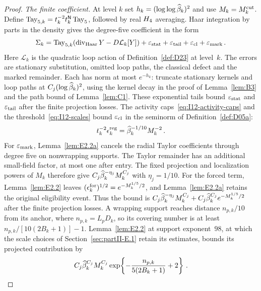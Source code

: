 \begin{proof}
\emph{The finite coefficient.} At level $k$ set $h_k=(\log\log\widehat{\beta}_k)^2$ and use $M_k=M^{\mathrm{cut}}_k$. Define $\operatorname{Tay}_{5,k}=t_k^{-2}t_k^{\mathsf{N}}\operatorname{Tay}_5$, followed by real $H_4$ averaging. Haar integration by parts in the density gives the degree-five coefficient in the form
\begin{equation}\label{eq:I-five-pieces}
\Sigma_k=\operatorname{Tay}_{5,k}(\operatorname{div}_{\rm Haar}Y-D\mathcal L_k[Y])
+\varepsilon_{\rm stat}+\varepsilon_{\rm tail}+\varepsilon_{\rm cl}+\varepsilon_{\rm mark}\,.
\end{equation}
Here $\mathcal L_k$ is the quadratic loop action of Definition~\ref{def:D23} at level~$k$. The errors are stationary substitution, omitted loop paths, the classical defect and the marked remainder. Each has norm at most $e^{-h_k}$: truncate stationary kernels and loop paths at $C_j(\log\widehat{\beta}_k)^2$, using the kernel decay in the proof of Lemma~\ref{lem:B3} and the path bound of Lemma~\ref{lem:C1}. These exponential tails bound $\varepsilon_{\rm stat}$ and $\varepsilon_{\rm tail}$ after the finite projection losses. The activity caps~\eqref{eq:I12-activity-caps} and the threshold~\eqref{eq:I12-scales} bound $\varepsilon_{\rm cl}$ in the seminorm of Definition~\ref{def:D05a}:
\begin{equation*}
 t_k^{-2}\epsilon_k^{\rm reg}=\widehat{\beta}_k^{-1/10}M_k^{-2}\,.
\end{equation*}
For $\varepsilon_{\rm mark}$, Lemma~\ref{lem:E2.2a} cancels the radial Taylor coefficients through degree five on nonwrapping supports. The Taylor remainder has an additional small-field factor, at most one after entry. The fixed projection and localization powers of $M_k$ therefore give $C_j\widehat{\beta}_k^{-\eta_j}M_k^{C_j}$ with $\eta_j=1/10$. For the forced term, Lemma~\ref{lem:E2.2} leaves $(\epsilon_k^{\rm for})^{1/2}=e^{-M_k^{1/5}/2}$, and Lemma~\ref{lem:E2.2a} retains the original eligibility event. Thus the bound is
$C_j\widehat{\beta}_k^{-\eta_j}M_k^{C_j}+C_j\widehat{\beta}_k^{C_j}e^{-M_k^{1/5}/2}$
after the finite projection losses. A wrapping support reaches distance $n_{p,k}/10$ from its anchor, where $n_{p,k}=L_pD_k$, so its covering number is at least $n_{p,k}/[10(2B_k+1)]-1$. Lemma~\ref{lem:E2.2} at support exponent~$98$, at which the scale choices of Section~\ref{sec:partII-E.1} retain its estimates, bounds its projected contribution by
\begin{equation*}
C_j\widehat{\beta}_k^{C_j}M_k^{C_j}
\exp\!\left\{-\frac{n_{p,k}}{5(2B_k+1)}+2\right\}\,.
\end{equation*}

\end{proof}
